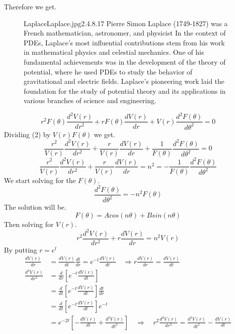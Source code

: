 Therefore we get.
\begin{figure}[b]
    \begin{minipage}[h]{\textwidth}
    \begin{enrichment}{Laplace}{Laplace.jpg}{2.4}{.8}{.17}
        Pierre Simon Laplace (1749-1827) was a French mathematician, astronomer, and physicist 
        In the context of PDEs, Laplace's most influential contributions stem from his work in mathematical physics and celestial mechanics. One of his fundamental achievements was in the development of the theory of potential, where he used PDEs to study the behavior of gravitational and electric fields. Laplace's pioneering work laid the foundation for the study of potential theory and its applications in various branches of science and engineering.
    \end{enrichment}    
\end{minipage}
\end{figure}
\begin{equation}
r^2F(\theta)\frac{d^2 V(r)}{dr^2} +rF(\theta)\frac{d V(r)}{dr} + V(r)\frac{d^2 F(\theta)}{d\theta^2} = 0
\end{equation}
Dividing (2) by $V(r)F(\theta)$ we get.
\begin{equation}
\frac{r^2}{V(r)}\frac{d^2 V(r)}{dr^2} +\frac{r}{V(r)}\frac{d V(r)}{dr} + \frac{1}{F(\theta)}\frac{d^2 F(\theta)}{d\theta^2} = 0
\end{equation}
\[
    \frac{r^2}{V(r)}\frac{d^2 V(r)}{dr^2} +\frac{r}{V(r)}\frac{d V(r)}{dr} = n^2 = -\frac{1}{F(\theta)}\frac{d^2 F(\theta)}{d\theta^2}    
\]
We start solving for the $F(\theta)$. 
\[
    \frac{d^2 F(\theta)}{d\theta^2} = -n^2F(\theta)    
\]
The solution will be. 
\begin{equation}
F(\theta) = A cos(n\theta)+B sin(n\theta)
\end{equation}
Then solving for $V(r)$.
\[
r^2\frac{d^2 V(r)}{dr^2} +r\frac{d V(r)}{dr} = n^2V(r)    
\]
By putting $r = e^t$
\begin{align*}
\frac{dV(r)}{dr} &= \frac{dV(r)}{dt}\frac{dt}{dr} = e^{-t} \frac{dV(r)}{dt} \quad\Rightarrow  r \frac{dV(r)}{dr}=\frac{dV(r)}{dt}
\\
\frac{d^2V(r)}{dr^2} &= \frac{d}{dr}\left[e^{-t} \frac{dV(r)}{dt}\right]
\\
&=  \frac{d}{dt}\left[e^{-t} \frac{dV(r)}{dt}\right] \frac{dt}{dr} 
\\
&= \frac{d}{dt}\left[e^{-t} \frac{dV(r)}{dt}\right] e^{-t}
\\
&= e^{-2t}\left[-\frac{dV(r)}{dt}+\frac{d^2V(r)}{dt^2}\right] \quad \Rightarrow \quad r^2\frac{d^2V(r)}{dr^2} = \frac{d^2V(r)}{dt^2}-\frac{dV(r)}{dt}
\end{align*}
